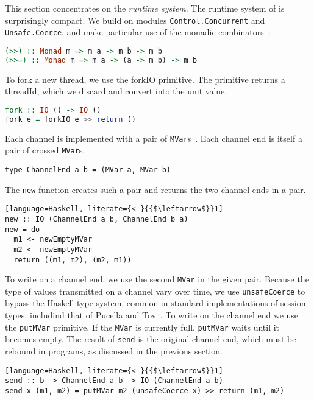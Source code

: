 %
This section concentrates on the \emph{runtime system}.
%
The runtime system of \freest{} is surprisingly compact. We build on
modules \lstinline|Control.Concurrent| and \lstinline|Unsafe.Coerce|,
and make particular use of the monadic
combinators~\cite{DBLP:conf/afp/Wadler95}:
%
\begin{lstlisting}[language=Haskell]
(>>) :: Monad m => m a -> m b -> m b
(>>=) :: Monad m => m a -> (a -> m b) -> m b
\end{lstlisting}

To fork a new thread, we use the forkIO primitive. The primitive
returns a threadId, which we discard and convert into the unit value.
%
\begin{lstlisting}[language=Haskell]
fork :: IO () -> IO ()
fork e = forkIO e >> return ()
\end{lstlisting}

Each channel is implemented with a pair of
\lstinline|MVar|s~\cite{DBLP:conf/popl/JonesGF96}. Each channel end is
itself a pair of crossed \lstinline|MVar|s.
%
\begin{lstlisting}
type ChannelEnd a b = (MVar a, MVar b)
\end{lstlisting}

The \lstinline|new| function creates such a pair and returns the two
channel ends in a pair.
%
\begin{lstlisting}[language=Haskell, literate={<-}{{$\leftarrow$}}1]
new :: IO (ChannelEnd a b, ChannelEnd b a)
new = do
  m1 <- newEmptyMVar
  m2 <- newEmptyMVar
  return ((m1, m2), (m2, m1))
\end{lstlisting}

To write on a channel end, we use the second \lstinline|MVar| in the
given pair. Because the type of values transmitted on a channel vary
over time, we use \lstinline|unsafeCoerce| to bypass the Haskell type
system, common in standard implementations of session types, includind
that of Pucella and Tov~\cite{DBLP:conf/haskell/PucellaT08}. To write
on the channel end we use the \lstinline|putMVar| primitive. If the
\lstinline|MVar| is currently full, \lstinline|putMVar| waits until it
becomes empty.  The result of \lstinline|send| is the original channel
end, which must be rebound in programs, as discussed in the previous
section.
%
\begin{lstlisting}[language=Haskell, literate={<-}{{$\leftarrow$}}1]
send :: b -> ChannelEnd a b -> IO (ChannelEnd a b)
send x (m1, m2) = putMVar m2 (unsafeCoerce x) >> return (m1, m2)
\end{lstlisting}

